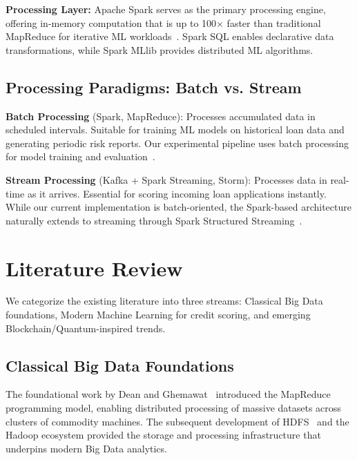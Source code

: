 \documentclass[runningheads]{llncs}
\begin{document}
\textbf{Processing Layer:} Apache Spark serves as the primary processing engine, offering in-memory computation that is up to 100$\times$ faster than traditional MapReduce for iterative ML workloads~\cite{zaharia2016spark}. Spark SQL enables declarative data transformations, while Spark MLlib provides distributed ML algorithms.

\subsection{Processing Paradigms: Batch vs. Stream}

\textbf{Batch Processing} (Spark, MapReduce): Processes accumulated data in scheduled intervals. Suitable for training ML models on historical loan data and generating periodic risk reports. Our experimental pipeline uses batch processing for model training and evaluation~\cite{dean2004mapreduce, sakr2017frameworks}.

\textbf{Stream Processing} (Kafka + Spark Streaming, Storm): Processes data in real-time as it arrives. Essential for scoring incoming loan applications instantly. While our current implementation is batch-oriented, the Spark-based architecture naturally extends to streaming through Spark Structured Streaming~\cite{kreps2011kafka}.



\section{Literature Review}
\label{sec:literature}

We categorize the existing literature into three streams: Classical Big Data foundations, Modern Machine Learning for credit scoring, and emerging Blockchain/Quantum-inspired trends.

\subsection{Classical Big Data Foundations}

The foundational work by Dean and Ghemawat~\cite{dean2004mapreduce} introduced the MapReduce programming model, enabling distributed processing of massive datasets across clusters of commodity machines. The subsequent development of HDFS~\cite{shvachko2010hdfs} and the Hadoop ecosystem provided the storage and processing infrastructure that underpins modern Big Data analytics.
\end{document}
